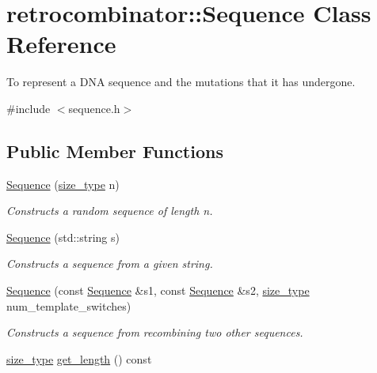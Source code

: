 \hypertarget{classretrocombinator_1_1Sequence}{}\section{retrocombinator\+:\+:Sequence Class Reference}
\label{classretrocombinator_1_1Sequence}


To represent a D\+NA sequence and the mutations that it has undergone.  




{\ttfamily \#include $<$sequence.\+h$>$}

\subsection*{Public Member Functions}
\begin{DoxyCompactItemize}
\item 
\hyperlink{classretrocombinator_1_1Sequence_a04d0d6977316f2ab30844e584c4531ec}{Sequence} (\hyperlink{constants_8h_a8e1541b50cee66a791df4c437ccbb385}{size\+\_\+type} n)
\begin{DoxyCompactList}\small\item\em Constructs a random sequence of length {\itshape n}. \end{DoxyCompactList}\item 
\hyperlink{classretrocombinator_1_1Sequence_af5b3b62eba07f0e09f532fcf1681c289}{Sequence} (std\+::string s)
\begin{DoxyCompactList}\small\item\em Constructs a sequence from a given string. \end{DoxyCompactList}\item 
\hyperlink{classretrocombinator_1_1Sequence_af334c44bea806196b5037e61b0e831b1}{Sequence} (const \hyperlink{classretrocombinator_1_1Sequence}{Sequence} \&s1, const \hyperlink{classretrocombinator_1_1Sequence}{Sequence} \&s2, \hyperlink{constants_8h_a8e1541b50cee66a791df4c437ccbb385}{size\+\_\+type} num\+\_\+template\+\_\+switches)
\begin{DoxyCompactList}\small\item\em Constructs a sequence from recombining two other sequences. \end{DoxyCompactList}\item 
\mbox{\label{classretrocombinator_1_1Sequence_aeefc98943c08769af4ed9f73157d26d1}} 
\hyperlink{constants_8h_a8e1541b50cee66a791df4c437ccbb385}{size\+\_\+type} \hyperlink{classretrocombinator_1_1Sequence_aeefc98943c08769af4ed9f73157d26d1}{get\+\_\+length} () const

\end{DoxyCompactItemize}
